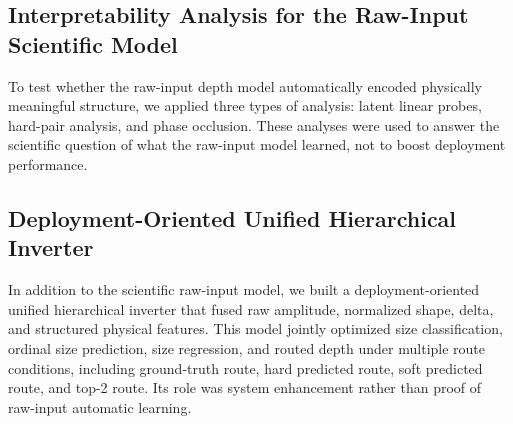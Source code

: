 \subsection{Interpretability Analysis for the Raw-Input Scientific Model}
To test whether the raw-input depth model automatically encoded physically meaningful structure, we applied three types of analysis: latent linear probes, hard-pair analysis, and phase occlusion. These analyses were used to answer the scientific question of what the raw-input model learned, not to boost deployment performance.

\subsection{Deployment-Oriented Unified Hierarchical Inverter}
In addition to the scientific raw-input model, we built a deployment-oriented unified hierarchical inverter that fused raw amplitude, normalized shape, delta, and structured physical features. This model jointly optimized size classification, ordinal size prediction, size regression, and routed depth under multiple route conditions, including ground-truth route, hard predicted route, soft predicted route, and top-2 route. Its role was system enhancement rather than proof of raw-input automatic learning.

